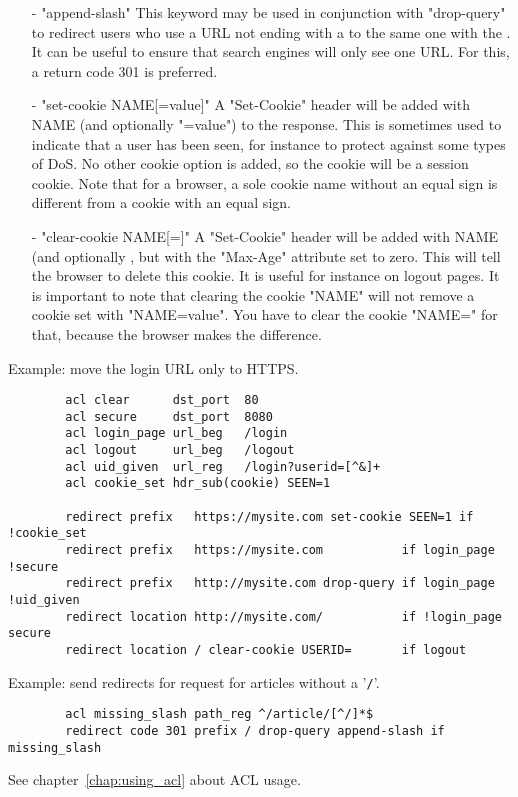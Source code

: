 \begin{description}
\begin{itemize}
      \item[-] "append-slash"
        This keyword may be used in conjunction with "drop-query" to redirect
        users who use a URL not ending with a \chr{/} to the same one with the \chr{/}.
        It can be useful to ensure that search engines will only see one URL.
        For this, a return code 301 is preferred.

      \item[-] "set-cookie NAME[=value]"
        A "Set-Cookie" header will be added with NAME (and optionally "=value")
        to the response. This is sometimes used to indicate that a user has
        been seen, for instance to protect against some types of DoS. No other
        cookie option is added, so the cookie will be a session cookie. Note
        that for a browser, a sole cookie name without an equal sign is
        different from a cookie with an equal sign.

      \item[-] "clear-cookie NAME[=]"
        A "Set-Cookie" header will be added with NAME (and optionally \chr{=}, but
        with the "Max-Age" attribute set to zero. This will tell the browser to
        delete this cookie. It is useful for instance on logout pages. It is
        important to note that clearing the cookie "NAME" will not remove a
        cookie set with "NAME=value". You have to clear the cookie "NAME=" for
        that, because the browser makes the difference.
      \end{itemize}
  \end{description}

  Example: move the login URL only to HTTPS.
  \begin{verbatim}
        acl clear      dst_port  80
        acl secure     dst_port  8080
        acl login_page url_beg   /login
        acl logout     url_beg   /logout
        acl uid_given  url_reg   /login?userid=[^&]+
        acl cookie_set hdr_sub(cookie) SEEN=1

        redirect prefix   https://mysite.com set-cookie SEEN=1 if !cookie_set
        redirect prefix   https://mysite.com           if login_page !secure
        redirect prefix   http://mysite.com drop-query if login_page !uid_given
        redirect location http://mysite.com/           if !login_page secure
        redirect location / clear-cookie USERID=       if logout
  \end{verbatim}

  Example: send redirects for request for articles without a '\verb|/|'.
  \begin{verbatim}
        acl missing_slash path_reg ^/article/[^/]*$
        redirect code 301 prefix / drop-query append-slash if missing_slash
  \end{verbatim}
  See chapter~\ref{chap:using_acl} about ACL usage.

